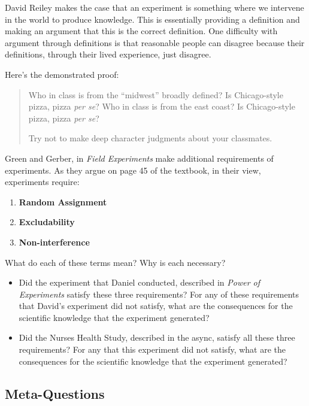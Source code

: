 \documentclass[
]{book}
\providecommand{\tightlist}{%
  \setlength{\itemsep}{0pt}\setlength{\parskip}{0pt}}
\begin{document}
David Reiley makes the case that an experiment is something where we
intervene in the world to produce knowledge. This is essentially
providing a definition and making an argument that this is the correct
definition. One difficulty with argument through definitions is that
reasonable people can disagree because their definitions, through their
lived experience, just disagree.

Here's the demonstrated proof:

\begin{quote}
Who in class is from the ``midwest'' broadly defined? Is Chicago-style
pizza, pizza \emph{per se}? Who in class is from the east coast? Is
Chicago-style pizza, pizza \emph{per se}?

Try not to make deep character judgments about your classmates.
\end{quote}

Green and Gerber, in \emph{Field Experiments} make additional
requirements of experiments. As they argue on page 45 of the textbook,
in their view, experiments require:

\begin{enumerate}
\def\labelenumi{\arabic{enumi}.}
\tightlist
\item
  \textbf{Random Assignment}
\item
  \textbf{Excludability}
\item
  \textbf{Non-interference}
\end{enumerate}

What do each of these terms mean? Why is each necessary?

\begin{itemize}
\tightlist
\item
  Did the experiment that Daniel conducted, described in \emph{Power of
  Experiments} satisfy these three requirements? For any of these
  requirements that David's experiment did not satisfy, what are the
  consequences for the scientific knowledge that the experiment
  generated?\\
\item
  Did the Nurses Health Study, described in the async, satisfy all these
  three requirements? For any that this experiment did not satisfy, what
  are the consequences for the scientific knowledge that the experiment
  generated?
\end{itemize}

\hypertarget{meta-questions}{%
\subsection{Meta-Questions}\label{meta-questions}}
\end{document}
